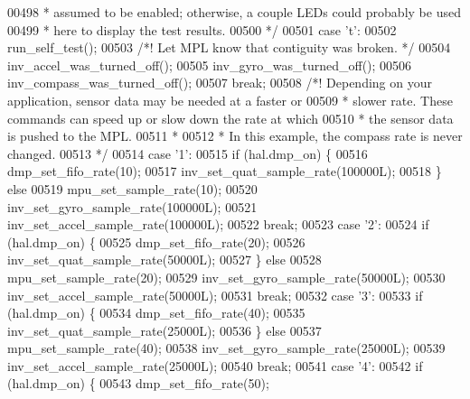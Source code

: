 \begin{DoxyCode}
{{{{{{{{00498 \textcolor{comment}{     * assumed to be enabled; otherwise, a couple LEDs could probably be used}
00499 \textcolor{comment}{     * here to display the test results.}
00500 \textcolor{comment}{     */}
00501     \textcolor{keywordflow}{case} \textcolor{stringliteral}{'t'}:
00502         run_self_test();
00503         \textcolor{comment}{/*! Let MPL know that contiguity was broken. */}
00504         inv\_accel\_was\_turned\_off();
00505         inv\_gyro\_was\_turned\_off();
00506         inv\_compass\_was\_turned\_off();
00507         \textcolor{keywordflow}{break};
00508     \textcolor{comment}{/*! Depending on your application, sensor data may be needed at a faster or}
00509 \textcolor{comment}{     * slower rate. These commands can speed up or slow down the rate at which}
00510 \textcolor{comment}{     * the sensor data is pushed to the MPL.}
00511 \textcolor{comment}{     *}
00512 \textcolor{comment}{     * In this example, the compass rate is never changed.}
00513 \textcolor{comment}{     */}
00514     \textcolor{keywordflow}{case} \textcolor{stringliteral}{'1'}:
00515         \textcolor{keywordflow}{if} (hal.dmp_on) \{
00516             dmp\_set\_fifo\_rate(10);
00517             inv\_set\_quat\_sample\_rate(100000L);
00518         \} \textcolor{keywordflow}{else}
00519             mpu\_set\_sample\_rate(10);
00520         inv\_set\_gyro\_sample\_rate(100000L);
00521         inv\_set\_accel\_sample\_rate(100000L);
00522         \textcolor{keywordflow}{break};
00523     \textcolor{keywordflow}{case} \textcolor{stringliteral}{'2'}:
00524         \textcolor{keywordflow}{if} (hal.dmp_on) \{
00525             dmp\_set\_fifo\_rate(20);
00526             inv\_set\_quat\_sample\_rate(50000L);
00527         \} \textcolor{keywordflow}{else}
00528             mpu\_set\_sample\_rate(20);
00529         inv\_set\_gyro\_sample\_rate(50000L);
00530         inv\_set\_accel\_sample\_rate(50000L);
00531         \textcolor{keywordflow}{break};
00532     \textcolor{keywordflow}{case} \textcolor{stringliteral}{'3'}:
00533         \textcolor{keywordflow}{if} (hal.dmp_on) \{
00534             dmp\_set\_fifo\_rate(40);
00535             inv\_set\_quat\_sample\_rate(25000L);
00536         \} \textcolor{keywordflow}{else}
00537             mpu\_set\_sample\_rate(40);
00538         inv\_set\_gyro\_sample\_rate(25000L);
00539         inv\_set\_accel\_sample\_rate(25000L);
00540         \textcolor{keywordflow}{break};
00541     \textcolor{keywordflow}{case} \textcolor{stringliteral}{'4'}:
00542         \textcolor{keywordflow}{if} (hal.dmp_on) \{
00543             dmp\_set\_fifo\_rate(50);
}}}}}}}}
\end{DoxyCode}
